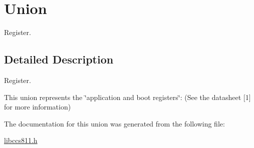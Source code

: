 \hypertarget{union_union}{}\section{Union}
\label{union_union}


Register.  




\subsection{Detailed Description}
Register. 

This union represents the \char`\"{}application and boot registers\char`\"{}\+: (See the datasheet \mbox{[}1\mbox{]} for more information) 

The documentation for this union was generated from the following file\+:\begin{DoxyCompactItemize}
\item 
\mbox{\hyperlink{libccs811_8h}{libccs811.\+h}}\end{DoxyCompactItemize}
